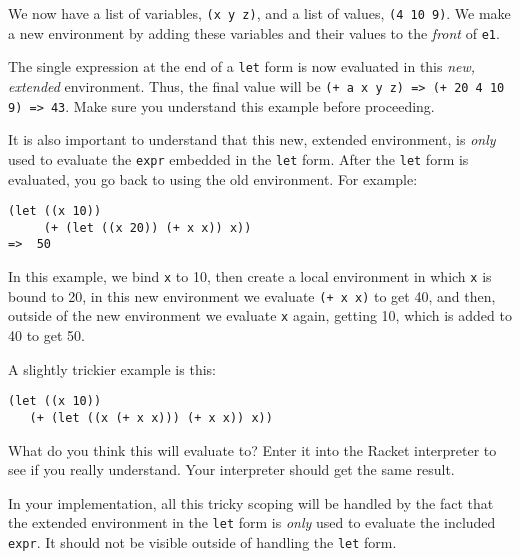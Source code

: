 \documentclass[letterpaper,12pt]{article}
\begin{document}
\begin{multicols}{2}
  We now have a list of variables, \verb|(x y z)|, and a list of values,
  \verb|(4 10 9)|.  We make a new environment by adding these variables and
  their values to the {\em front} of \verb|e1|.

  The single expression at the end of a \verb|let| form is now evaluated in this
  {\em new, extended} environment.  Thus, the final value will be
  \verb|(+ a x y z) => (+ 20 4 10 9) => 43|.  Make sure you understand this
  example before proceeding.

  It is also important to understand that this new, extended environment, is
  {\em only } used to evaluate the \verb|expr| embedded in the \verb|let| form.
  After the \verb|let| form is evaluated, you go back to using the old
  environment.  For example:
\begin{Verbatim}
(let ((x 10)) 
     (+ (let ((x 20)) (+ x x)) x))
=>  50
\end{Verbatim}
  In this example, we bind \verb|x| to 10, then create a local environment in
  which \verb|x| is bound to 20, in this new environment we evaluate
  \verb|(+ x x)| to get 40, and then, outside of the new environment we evaluate
  \verb|x| again, getting 10, which is added to 40 to get 50.

  A slightly trickier example is this:
\begin{Verbatim}[frame=single]
(let ((x 10)) 
   (+ (let ((x (+ x x))) (+ x x)) x))
\end{Verbatim}
  What do you think this will evaluate to?  Enter it into the Racket interpreter
  to see if you really understand.  Your interpreter should get the same result.

  In your implementation, all this tricky scoping will be handled by the fact
  that the extended environment in the \verb|let| form is {\em only} used to
  evaluate the included \verb|expr|.  It should not be visible outside of
  handling the \verb|let| form.

\end{multicols}
\end{document}
